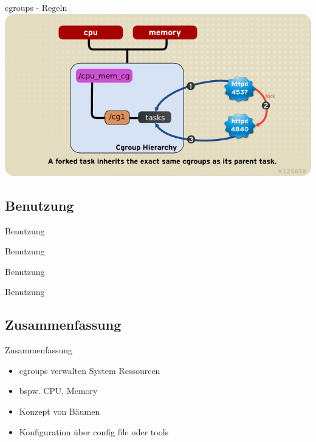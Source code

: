 \documentclass[14pt]{beamer}
\begin{document}
    \begin{frame}{cgroups - Regeln}
    \centering\includegraphics[scale=0.7]{logo/RMG-rule4}
    \end{frame}
    
    \subsection{Benutzung}
    \begin{frame}{Benutzung}
    
    \end{frame}
    \begin{frame}{Benutzung}
    
    \end{frame}
    \begin{frame}{Benutzung}
    
    \end{frame}
    \begin{frame}{Benutzung}
    
    \end{frame}
    
    \subsection{Zusammenfassung}
    \begin{frame}{Zusammenfassung}
    \begin{itemize}
    \item cgroups verwalten System Ressourcen
    \item bspw. CPU, Memory
    \item Konzept von Bäumen
    \item Konfiguration über config file oder tools
    \end{itemize}
    \end{frame}
    
\end{document}
